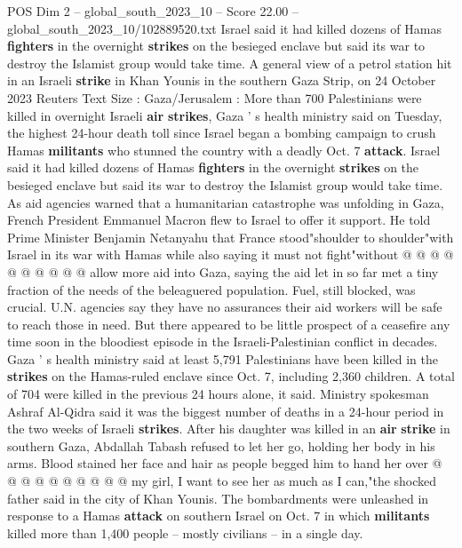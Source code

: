 \begin{textsample}{POS Dim 2 – global\_south\_2023\_10 – Score 22.00 – global\_south\_2023\_10/102889520.txt}  \label{ex:f2_pos_058}
Israel said it had killed dozens of Hamas \textbf{fighters} in the overnight \textbf{strikes} on the besieged enclave but said its war to destroy the Islamist group would take time.
A general view of a petrol station hit in an Israeli \textbf{strike} in Khan Younis in the southern Gaza Strip, on 24 October 2023 Reuters Text Size : Gaza/Jerusalem : More than 700 Palestinians were killed in overnight Israeli \textbf{air} \textbf{strikes}, Gaza ' s health ministry said on Tuesday, the highest 24-hour death toll since Israel began a bombing campaign to crush Hamas \textbf{militants} who stunned the country with a deadly Oct. 7 \textbf{attack}.
Israel said it had killed dozens of Hamas \textbf{fighters} in the overnight \textbf{strikes} on the besieged enclave but said its war to destroy the Islamist group would take time.
As aid agencies warned that a humanitarian catastrophe was unfolding in Gaza, French President Emmanuel Macron flew to Israel to offer it support.
He told Prime Minister Benjamin Netanyahu that France stood"shoulder to shoulder"with Israel in its war with Hamas while also saying it must not fight"without @ @ @ @ @ @ @ @ @ @ allow more aid into Gaza, saying the aid let in so far met a tiny fraction of the needs of the beleaguered population.
Fuel, still blocked, was crucial.
U.N. agencies say they have no assurances their aid workers will be safe to reach those in need.
But there appeared to be little prospect of a ceasefire any time soon in the bloodiest episode in the Israeli-Palestinian conflict in decades.
Gaza ' s health ministry said at least 5,791 Palestinians have been killed in the \textbf{strikes} on the Hamas-ruled enclave since Oct. 7, including 2,360 children.
A total of 704 were killed in the previous 24 hours alone, it said.
Ministry spokesman Ashraf Al-Qidra said it was the biggest number of deaths in a 24-hour period in the two weeks of Israeli \textbf{strikes}.
After his daughter was killed in an \textbf{air} \textbf{strike} in southern Gaza, Abdallah Tabash refused to let her go, holding her body in his arms.
Blood stained her face and hair as people begged him to hand her over @ @ @ @ @ @ @ @ @ @ my girl, I want to see her as much as I can,"the shocked father said in the city of Khan Younis.
The bombardments were unleashed in response to a Hamas \textbf{attack} on southern Israel on Oct. 7 in which \textbf{militants} killed more than 1,400 people -- mostly civilians -- in a single day.

\end{textsample}
